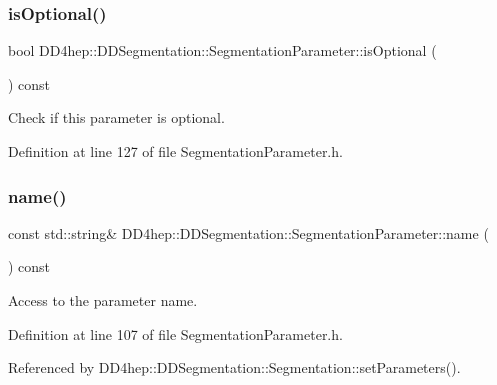 \subsubsection{\texorpdfstring{is\+Optional()}{isOptional()}}
{\footnotesize\ttfamily bool D\+D4hep\+::\+D\+D\+Segmentation\+::\+Segmentation\+Parameter\+::is\+Optional (\begin{DoxyParamCaption}{ }\end{DoxyParamCaption}) const\hspace{0.3cm}{\ttfamily [inline]}}



Check if this parameter is optional. 



Definition at line 127 of file Segmentation\+Parameter.\+h.

\hypertarget{class_d_d4hep_1_1_d_d_segmentation_1_1_segmentation_parameter_a0e75457623ff527592fa127f358185a7}{}\label{class_d_d4hep_1_1_d_d_segmentation_1_1_segmentation_parameter_a0e75457623ff527592fa127f358185a7} 
\subsubsection{\texorpdfstring{name()}{name()}}
{\footnotesize\ttfamily const std\+::string\& D\+D4hep\+::\+D\+D\+Segmentation\+::\+Segmentation\+Parameter\+::name (\begin{DoxyParamCaption}{ }\end{DoxyParamCaption}) const\hspace{0.3cm}{\ttfamily [inline]}}



Access to the parameter name. 



Definition at line 107 of file Segmentation\+Parameter.\+h.



Referenced by D\+D4hep\+::\+D\+D\+Segmentation\+::\+Segmentation\+::set\+Parameters().

\hypertarget{class_d_d4hep_1_1_d_d_segmentation_1_1_segmentation_parameter_a91e9dae172660687daec4de4d730b192}{}\label{class_d_d4hep_1_1_d_d_segmentation_1_1_segmentation_parameter_a91e9dae172660687daec4de4d730b192} 
